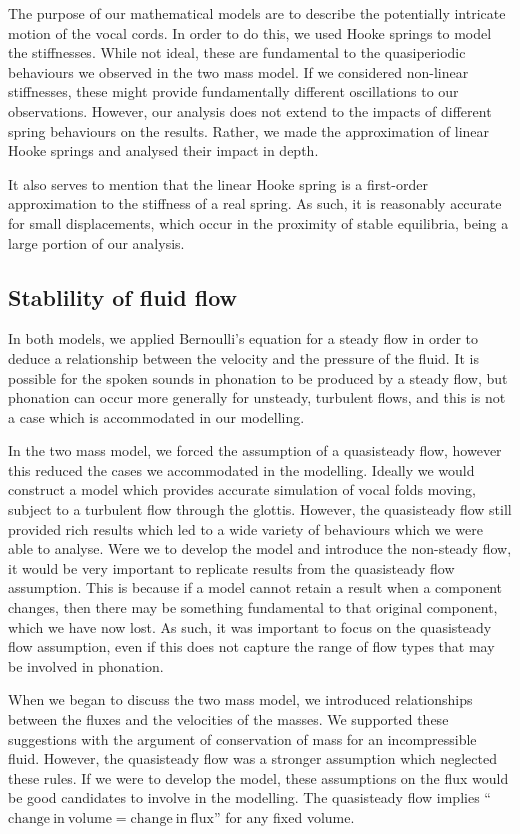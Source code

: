 \documentclass{report}
\begin{document}
The purpose of our mathematical models are to describe the potentially intricate motion of the vocal cords.
In order to do this,
we used Hooke springs to model the stiffnesses.
While not ideal, these are fundamental to the quasiperiodic behaviours we observed in the two mass model.
If we considered non-linear stiffnesses,
these might provide fundamentally different oscillations to our observations.
However, our analysis does not extend to the impacts of different spring behaviours on the results.
Rather, we made the approximation of linear Hooke springs and analysed their impact in depth.

It also serves to mention that the linear Hooke spring is a first-order approximation to the stiffness of a real spring.
As such, it is reasonably accurate for small displacements,
which occur in the proximity of stable equilibria,
being a large portion of our analysis.

\subsection{Stablility of fluid flow}

In both models,
we applied Bernoulli's equation for a steady flow in order to deduce a relationship between the velocity and the pressure of the fluid.
It is possible for the spoken sounds in phonation to be produced by a steady flow,
but phonation can occur more generally for unsteady, turbulent flows,
and this is not a case which is accommodated in our modelling.

In the two mass model,
we forced the assumption of a quasisteady flow,
however this reduced the cases we accommodated in the modelling.
Ideally we would construct a model which provides accurate simulation of vocal folds moving, subject to a turbulent flow through the glottis.
However, the quasisteady flow still provided rich results which led to a wide variety of behaviours which we were able to analyse.
Were we to develop the model and introduce the non-steady flow,
it would be very important to replicate results from the quasisteady flow assumption.
This is because if a model cannot retain a result when a component changes,
then there may be something fundamental to that original component,
which we have now lost.
As such,
it was important to focus on the quasisteady flow assumption,
even if this does not capture the range of flow types that may be involved in phonation.

When we began to discuss the two mass model,
we introduced relationships between the fluxes and the velocities of the masses.
We supported these suggestions with the argument of conservation of mass for an incompressible fluid.
However, the quasisteady flow was a stronger assumption which neglected these rules.
If we were to develop the model,
these assumptions on the flux would be good candidates to involve in the modelling.
The quasisteady flow implies ``$\mathrm{change~in~volume}=\mathrm{change~in~flux}$'' for any fixed volume.
\end{document}
